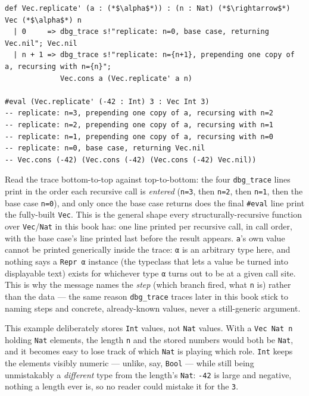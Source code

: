 \begin{lstlisting}
def Vec.replicate' (a : (*$\alpha$*)) : (n : Nat) (*$\rightarrow$*) Vec (*$\alpha$*) n
  | 0     => dbg_trace s!"replicate: n=0, base case, returning Vec.nil"; Vec.nil
  | n + 1 => dbg_trace s!"replicate: n={n+1}, prepending one copy of a, recursing with n={n}";
             Vec.cons a (Vec.replicate' a n)

#eval (Vec.replicate' (-42 : Int) 3 : Vec Int 3)
-- replicate: n=3, prepending one copy of a, recursing with n=2
-- replicate: n=2, prepending one copy of a, recursing with n=1
-- replicate: n=1, prepending one copy of a, recursing with n=0
-- replicate: n=0, base case, returning Vec.nil
-- Vec.cons (-42) (Vec.cons (-42) (Vec.cons (-42) Vec.nil))
\end{lstlisting}

Read the trace bottom-to-top against top-to-bottom: the four \texttt{dbg\_\allowbreak{}trace} lines print in the order each recursive call is \emph{entered} (\texttt{n=3}, then \texttt{n=2}, then \texttt{n=1}, then the base case \texttt{n=0}), and only once the base case returns does the final \texttt{\#eval} line print the fully-built \texttt{Vec}. This is the general shape every structurally-recursive function over \texttt{Vec}/\texttt{Nat} in this book has: one line printed per recursive call, in call order, with the base case's line printed last before the result appears. \texttt{a}'s own value cannot be printed generically inside the trace: \texttt{α} is an arbitrary type here, and nothing says a \texttt{Repr α} instance (the typeclass that lets a value be turned into displayable text) exists for whichever type \texttt{α} turns out to be at a given call site. This is why the message names the \emph{step} (which branch fired, what \texttt{n} is) rather than the data --- the same reason \texttt{dbg\_\allowbreak{}trace} traces later in this book stick to naming steps and concrete, already-known values, never a still-generic argument.

This example deliberately stores \texttt{Int} values, not \texttt{Nat} values. With a \texttt{Vec Nat n} holding \texttt{Nat} elements, the length \texttt{n} and the stored numbers would both be \texttt{Nat}, and it becomes easy to lose track of which \texttt{Nat} is playing which role. \texttt{Int} keeps the elements visibly numeric --- unlike, say, \texttt{Bool} --- while still being unmistakably a \emph{different} type from the length's \texttt{Nat}: \texttt{-\allowbreak{}42} is large and negative, nothing a length ever is, so no reader could mistake it for the \texttt{3}.

